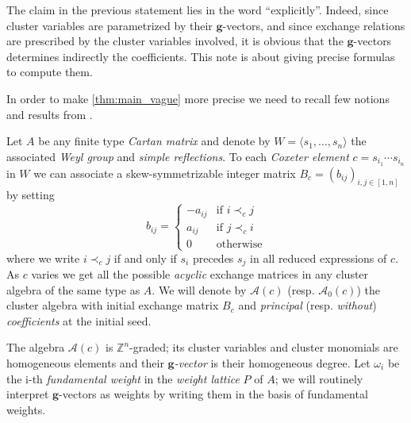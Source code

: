 \documentclass[11pt]{amsart}
\newcommand{\cA}{\mathcal{A}}
\newcommand{\ZZ}{\mathbb{Z}}
\newcommand{\bg}{\mathbf{g}}
\numberwithin{equation}{section}
\numberwithin{figure}{section}
\begin{document}
  
  The claim in the previous statement lies 
   in the word ``explicitly''. 
  Indeed, since cluster variables are parametrized by their $\bg$-vectors, and since exchange relations are prescribed by the cluster variables involved, it is obvious that the $\bg$-vectors determines indirectly the coefficients. 
  This note is about giving precise formulas to compute them.
 
  In order to make \cref{thm:main_vague} more precise we need to recall few notions and results from \cite{Ste13,YZ08}.

  Let $A$ be any finite type \emph{Cartan matrix} and denote by $W=\langle s_1,\dots,s_n\rangle$ the associated \emph{Weyl group} and \emph{simple reflections}.
  To each \emph{Coxeter element} $c=s_{i_1}\cdots s_{i_n}$ in $W$ we can associate a skew-symmetrizable integer matrix $B_c=(b_{ij})_{i,j\in[1,n]}$ by setting
  \[
    b_{ij}=
    \begin{cases}
      -a_{ij} & \text{if } i\prec_c j  \\
      a_{ij}  & \text{if } j\prec_c i  \\
      0       & \text{otherwise}
    \end{cases}
  \]
  where we write $i\prec_c j$ if and only if $s_i$ precedes $s_j$ in all reduced expressions of $c$.
  As $c$ varies we get all the possible \emph{acyclic} exchange matrices in any cluster algebra of the same type as $A$.
  We will denote by $\cA(c)$ \say[NR]{You probably want $\cA_\bullet(c)$ here?} 
   (resp. $\cA_0(c)$) the cluster algebra with initial exchange matrix $B_c$ and  \emph{principal} (resp. \emph{without}) \emph{coefficients} at the initial seed.

  The algebra $\cA(c)$ is $\ZZ^n$-graded; its cluster variables and cluster monomials are homogeneous elements and their \emph{$\bg$-vector} is their homogeneous degree.
  Let $\omega_i$ be the i-th \emph{fundamental weight} in the \emph{weight lattice} $P$ of $A$; we will routinely interpret $\bg$-vectors as weights by writing them in the basis of fundamental weights.
\end{document}
